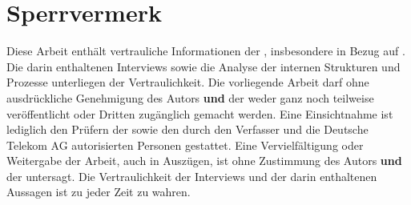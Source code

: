 \section*{Sperrvermerk}
\label{sec:Sperrvermerk}
Diese Arbeit enthält vertrauliche Informationen der \betriebName, insbesondere in Bezug auf \titlePruefung. Die darin enthaltenen Interviews sowie die Analyse der internen Strukturen und Prozesse unterliegen der Vertraulichkeit.
\br
Die vorliegende Arbeit darf ohne ausdrückliche Genehmigung des Autors \textbf{und} der \betriebName weder ganz noch teilweise veröffentlicht oder Dritten zugänglich gemacht werden. Eine Einsichtnahme ist lediglich den Prüfern der \insitution sowie den durch den Verfasser und die Deutsche Telekom AG autorisierten Personen gestattet. Eine Vervielfältigung oder Weitergabe der Arbeit, auch in Auszügen, ist ohne Zustimmung des Autors \textbf{und} der \betriebName untersagt.
\br
Die Vertraulichkeit der Interviews und der darin enthaltenen Aussagen ist zu jeder Zeit zu wahren.
